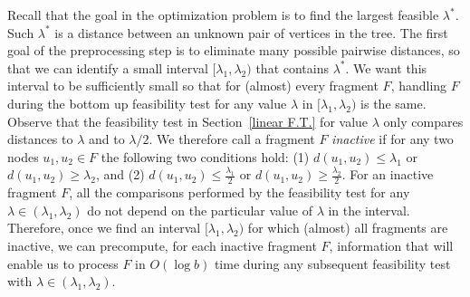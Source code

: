 \documentclass[11pt,a4paper]{article}
\theoremstyle{definition}
\theoremstyle{remark}
\begin{document}
Recall that the goal in the optimization problem is to find the largest feasible $\lambda^{*}$. Such $\lambda^{*}$
is a distance between an unknown pair of vertices in the tree. The first goal of the preprocessing step is to eliminate many possible pairwise distances, so that we can identify a small interval $[\lambda_1,\lambda_2)$ that contains $\lambda^*$. We want this interval to be sufficiently small so that for (almost) every fragment $F$, handling $F$ during the bottom up feasibility test for any value $\lambda$ in $[\lambda_1,\lambda_2)$ is the same. Observe that the feasibility test in Section~\ref{linear F.T.} for value $\lambda$ only compares distances to $\lambda$ and to $\lambda/2$. We therefore call a fragment $F$ \emph{inactive} if for any two nodes $u_1,u_2\in F$ the following two conditions hold: (1) $d(u_{1},u_{2})\leq \lambda_{1}$ or $d(u_{1},u_{2})\geq\lambda_{2}$, and (2) $d(u_{1},u_{2})\leq \frac{\lambda_{1}}{2}$ or $d(u_{1},u_{2})\geq \frac{\lambda_{2}}{2}$. For an inactive fragment $F$, all the comparisons performed by the feasibility test for any $\lambda \in (\lambda_1,\lambda_2)$ do not depend on the particular value of $\lambda$ in the interval. Therefore, once we find an interval $[\lambda_1,\lambda_2)$ for which (almost) all fragments are inactive, we can precompute, for each inactive fragment $F$, information that will enable us to process $F$ in $O(\log b)$ time during any subsequent feasibility test with $\lambda \in (\lambda_1,\lambda_2)$.
\end{document}
